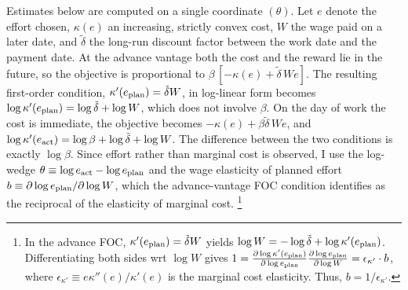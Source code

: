 \documentclass[11pt,a4paper]{article}
\theoremstyle{plain}
\theoremstyle{definition}
\begin{document}
Estimates below are computed on a single coordinate $(\theta)$. Let $e$ denote the effort chosen, $\kappa(e)$ an increasing, strictly convex cost, $W$ the wage paid on a later date, and $\tilde\delta$ the long-run discount factor between the work date and the payment date. 
At the advance vantage both the cost and the reward lie in the future, so the objective is proportional to $\beta\,[-\kappa(e)+\tilde\delta\,We]$.
The resulting first-order condition, $\kappa'(e_{\rm plan})=\tilde\delta W$, in log-linear form becomes $\log\kappa'(e_{\rm plan})=\log\tilde\delta+\log W$, which does not involve $\beta$.
On the day of work the cost is immediate, the objective becomes $-\kappa(e)+\beta\tilde\delta\,We$, and $\log\kappa'(e_{\rm act})=\log\beta+\log\tilde\delta+\log W$. The difference between the two conditions is exactly $\log\beta$. Since effort rather than marginal cost is observed, I use the log-wedge $\theta\equiv\log e_{\rm act}-\log e_{\rm plan}$ and the wage elasticity of planned effort $b\equiv\partial\log e_{\rm plan}/\partial\log W$, which the advance-vantage FOC condition identifies as the reciprocal of the elasticity of marginal cost.%
\footnote{%
In the advance FOC, $\kappa'(e_{\rm plan}) = \tilde\delta W$ yields $\log W = -\log \tilde\delta + \log \kappa'(e_{\rm plan})$. Differentiating both sides wrt $\log W$ gives $1 = \frac{\partial \log \kappa'(e_{\rm plan})}{\partial \log e_{\rm plan}} \frac{\partial \log e_{\rm plan}}{\partial \log W} = \epsilon_{\kappa'} \cdot b$, where $\epsilon_{\kappa'} \equiv e \kappa''(e)/\kappa'(e)$ is the marginal cost elasticity. Thus, $b = 1/\epsilon_{\kappa'}$.} 
\end{document}
